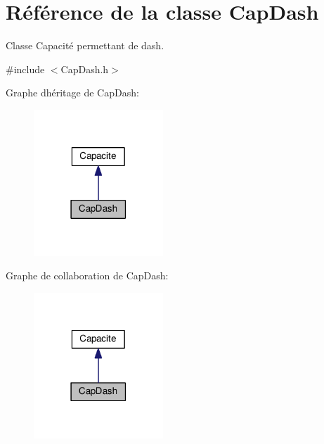 \hypertarget{class_cap_dash}{}\section{Référence de la classe Cap\+Dash}
\label{class_cap_dash}


Classe Capacité permettant de dash.  




{\ttfamily \#include $<$Cap\+Dash.\+h$>$}



Graphe d\textquotesingle{}héritage de Cap\+Dash\+:\nopagebreak
\begin{figure}[H]
\begin{center}
\leavevmode
\includegraphics[width=138pt]{class_cap_dash__inherit__graph}
\end{center}
\end{figure}


Graphe de collaboration de Cap\+Dash\+:\nopagebreak
\begin{figure}[H]
\begin{center}
\leavevmode
\includegraphics[width=138pt]{class_cap_dash__coll__graph}
\end{center}
\end{figure}
